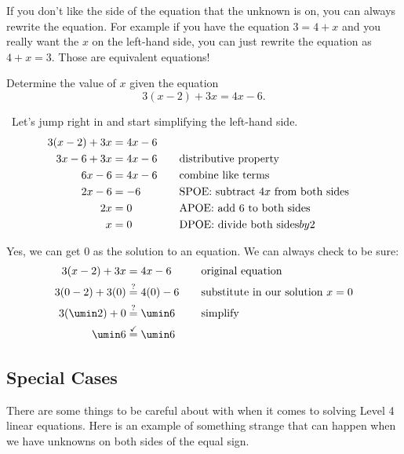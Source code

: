 If you don't like the side of the equation that the unknown is on, you can always rewrite the equation. For example if you have the equation $3=4+x$ and you really want the $x$ on the left-hand side, you can just rewrite the equation as $4+x=3$. Those are equivalent equations!

\begin{boxedex}
Determine the value of $x$ given the equation \[3(x-2)+3x=4x-6.\]

\exsoln\ Let's jump right in and start simplifying the left-hand side.
\[\begin{aligned}
3(x-2)+3x &= 4x-6\\
3x-6+3x &= 4x-6
&&\text{\quad distributive property}\\
6x-6 &= 4x-6
&&\text{\quad combine like terms}\\
2x-6 &= -6
&&\text{\quad SPOE: subtract $4x$ from both sides}\\
2x &= 0
&&\text{\quad APOE: add 6 to both sides}\\
x &= 0
&&\text{\quad DPOE: divide both sides} by 2\\
\end{aligned}\]

Yes, we can get 0 as the solution to an equation. We can always check to be sure:
\[\begin{aligned}
3(x-2)+3x &= 4x-6
&& \text{\quad original equation}\\
3(0-2)+3(0) &\overset{?}{=} 4(0)-6
&& \text{\quad substitute in our solution $x = 0$}\\
3(\umin2)+0 &\overset{?}{=} \umin6
&& \text{\quad simplify}\\
\umin6 &\overset{\checkmark}{=} \umin6\\
\end{aligned}\]
\end{boxedex}

\subsection{Special Cases}

There are some things to be careful about with when it comes to solving Level 4 linear equations. Here is an example of something strange that can happen when we have unknowns on both sides of the equal sign.

